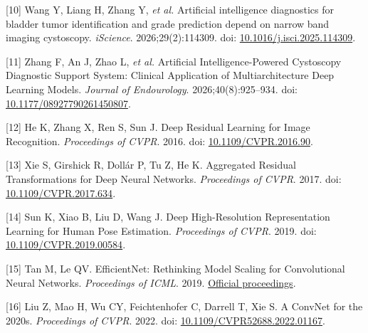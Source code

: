 \documentclass[
  10pt,
  a4paper,
  twocolumn]{article}
\begin{document}
{[}10{]} Wang Y, Liang H, Zhang Y, \emph{et al.} Artificial intelligence
diagnostics for bladder tumor identification and grade prediction depend
on narrow band imaging cystoscopy. \emph{iScience}. 2026;29(2):114309.
doi:
\href{https://doi.org/10.1016/j.isci.2025.114309}{10.1016/j.isci.2025.114309}.

{[}11{]} Zhang F, An J, Zhao L, \emph{et al.} Artificial
Intelligence-Powered Cystoscopy Diagnostic Support System: Clinical
Application of Multiarchitecture Deep Learning Models. \emph{Journal of
Endourology}. 2026;40(8):925--934. doi:
\href{https://doi.org/10.1177/08927790261450807}{10.1177/08927790261450807}.

{[}12{]} He K, Zhang X, Ren S, Sun J. Deep Residual Learning for Image
Recognition. \emph{Proceedings of CVPR}. 2016. doi:
\href{https://doi.org/10.1109/CVPR.2016.90}{10.1109/CVPR.2016.90}.

{[}13{]} Xie S, Girshick R, Dollár P, Tu Z, He K. Aggregated Residual
Transformations for Deep Neural Networks. \emph{Proceedings of CVPR}.
2017. doi:
\href{https://doi.org/10.1109/CVPR.2017.634}{10.1109/CVPR.2017.634}.

{[}14{]} Sun K, Xiao B, Liu D, Wang J. Deep High-Resolution
Representation Learning for Human Pose Estimation. \emph{Proceedings of
CVPR}. 2019. doi:
\href{https://doi.org/10.1109/CVPR.2019.00584}{10.1109/CVPR.2019.00584}.

{[}15{]} Tan M, Le QV. EfficientNet: Rethinking Model Scaling for
Convolutional Neural Networks. \emph{Proceedings of ICML}. 2019.
\href{https://proceedings.mlr.press/v97/tan19a.html}{Official
proceedings}.

{[}16{]} Liu Z, Mao H, Wu CY, Feichtenhofer C, Darrell T, Xie S. A
ConvNet for the 2020s. \emph{Proceedings of CVPR}. 2022. doi:
\href{https://doi.org/10.1109/CVPR52688.2022.01167}{10.1109/CVPR52688.2022.01167}.
\end{document}
